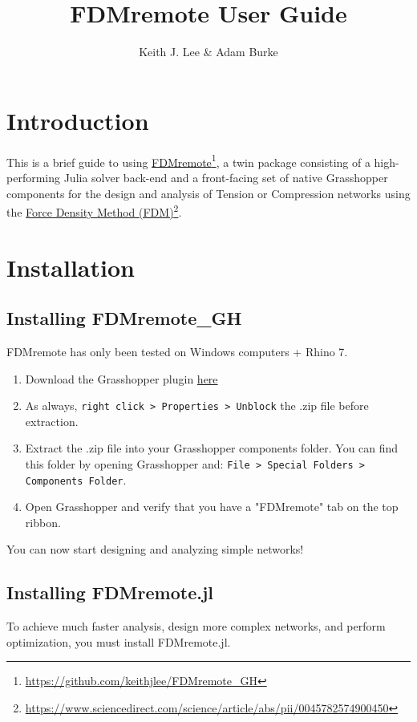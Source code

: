 \documentclass{ol-softwaremanual}
\title{FDMremote User Guide}
\author{Keith J. Lee \& Adam Burke}
\newcommand{\doclink}[2]{\href{#1}{#2}\footnote{\url{#1}}}
\begin{document}
\maketitle

\tableofcontents
\newpage

\section{Introduction}
This is a brief guide to using \doclink{https://github.com/keithjlee/FDMremote_GH}{FDMremote}, a twin package consisting of a high-performing Julia solver back-end and a front-facing set of native Grasshopper components for the design and analysis of Tension or Compression networks using the \doclink{https://www.sciencedirect.com/science/article/abs/pii/0045782574900450}{Force Density Method (FDM)}.

\section{Installation} \label{sec:installation}

\subsection*{Installing FDMremote\_GH}
\begin{center}
    {\color{kpink} FDMremote has only been tested on Windows computers + Rhino 7.}
\end{center}

\begin{enumerate}
    \item Download the Grasshopper plugin \href{https://www.food4rhino.com/en/app/fdmremote?lang=en}{here}
    \item As always, \texttt{right click > Properties > Unblock} the .zip file before extraction.
    \item Extract the .zip file into your Grasshopper components folder. You can find this folder by opening Grasshopper and: \texttt{File > Special Folders > Components Folder}.
    \item Open Grasshopper and verify that you have a "FDMremote" tab on the top ribbon.
\end{enumerate}

You can now start designing and analyzing simple networks!

\subsection*{Installing FDMremote.jl}
To achieve much faster analysis, design more complex networks, and perform optimization, you must install FDMremote.jl. 
\end{document}
